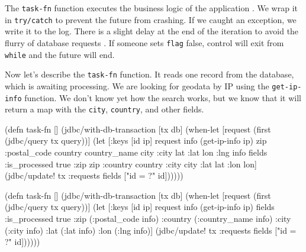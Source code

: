 \fi

The \verb|task-fn| function executes the business logic of the application . We wrap it in \verb|try/catch| to prevent the future from crashing. If we caught an exception, we write it to the log. There is a slight delay at the end of the iteration to avoid the flurry of database requests . If someone sets \verb|flag| false, control will exit from \verb|while| and the future will end.

Now let's describe the \verb|task-fn| function. It reads one record from the database, which is awaiting processing. We are looking for geodata by IP using the \verb|get-ip-info| function. We don't know yet how the search works, but we know that it will return a map with the \verb|city|, \verb|country|, and other fields.


\ifnarrow

\begin{english}
  \begin{clojure/lines}
(defn task-fn []
 (jdbc/with-db-transaction [tx db]
  (when-let [request
             (first
              (jdbc/query tx query))]
    (let [{:keys [id ip]} request
          info   (get-ip-info ip)
          {zip :postal_code
           country country_name
           city :city lat :lat
           lon :lng} info
          fields {:is_processed true
                  :zip zip
                  :country country
                  :city city
                  :lat lat
                  :lon lon}]
      (jdbc/update! tx :requests
        fields ["id = ?" id])))))
  \end{clojure/lines}
\end{english}

\else

\begin{english}
  \begin{clojure/lines}
(defn task-fn []
  (jdbc/with-db-transaction [tx db]
    (when-let [request (first (jdbc/query tx query))]
      (let [{:keys [id ip]} request
            info   (get-ip-info ip)
            fields {:is_processed true
                    :zip (:postal_code info)
                    :country (:country_name info)
                    :city (:city info)
                    :lat (:lat info)
                    :lon (:lng info)}]
        (jdbc/update! tx :requests
                      fields
                      ["id = ?" id])))))
  \end{clojure/lines}
\end{english}

